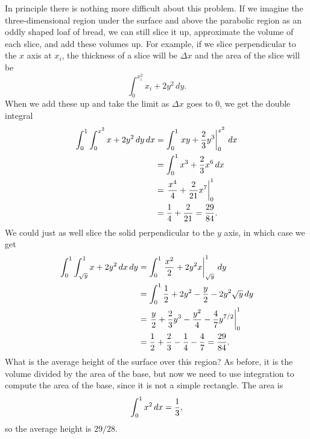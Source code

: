 In principle there is nothing more difficult about this problem. If we
imagine the three-dimensional region under the surface and above the
parabolic region as an oddly shaped loaf of bread, we can still slice
it up, approximate the volume of each slice, and add these volumes
up. For example, if we slice perpendicular to the $x$ axis at $x_i$, the
thickness of a slice will be $\Delta x$ and the area of the slice will
be 
\[\int_0^{x_i^2} x_i+2y^2\,dy.\]
When we add these up and take the limit as $\Delta x$ goes to 0, we
get the double integral
\begin{align*}
\int_0^1 \int_0^{x^2} x+2y^2\,dy\,dx
&=\int_0^1 \left.xy+{2\over3}y^3\right|_0^{x^2}\,dx	\\
&=\int_0^1 x^3+{2\over3}x^6\,dx	\\
&=\left. {x^4\over4}+{2\over21}x^7\right|_0^1	\\
&={1\over4}+{2\over21}={29\over84}.
\end{align*}
We could just as well slice the solid perpendicular to the $y$ axis,
in which case we get
\begin{align*}
\int_0^1 \int_{\sqrt y}^1 x+2y^2\,dx\,dy
&=\int_0^1 \left.{x^2\over2}+2y^2x\right|_{\sqrt y}^1 \,dy	\\
&=\int_0^1 {1\over2}+2y^2-{y\over2}-2y^2\sqrt y\,dy	\\
&=\left.{y\over2}+{2\over3}y^3-{y^2\over4}-{4\over7}y^{7/2}\right|_0^1	\\
&={1\over2}+{2\over3}-{1\over4}-{4\over7}={29\over84}.
\end{align*}
What is the average height of the surface over this region? As before,
it is the volume divided by the area of the base, but now we need to
use integration to compute the area of the base, since it is not a
simple rectangle. The area is
$$\int_0^1 x^2\,dx={1\over3},$$
so the average height is $29/28$.

